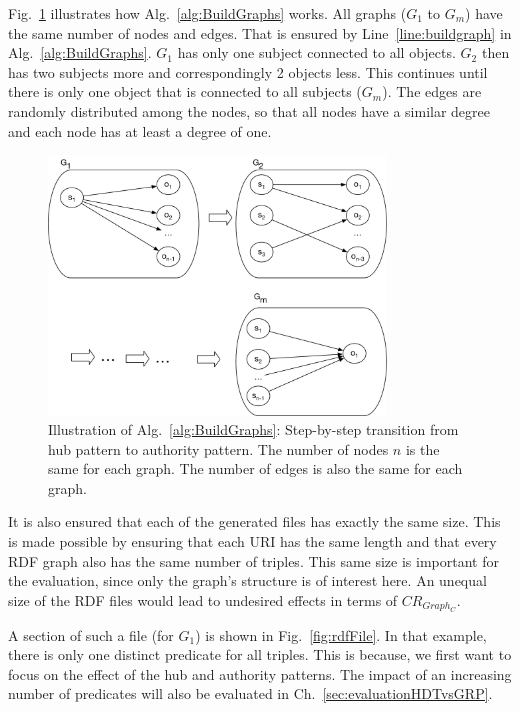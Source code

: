 \clearpage
Fig.~\ref{fig:star_pattern} illustrates how Alg.~\ref{alg:BuildGraphs} works. All graphs ($G_1$ to $G_m$) have the same number of nodes and edges. That is ensured by Line~\ref{line:buildgraph} in Alg.~\ref{alg:BuildGraphs}. $G_1$ has only one subject connected to all objects. $G_2$ then has two subjects more and correspondingly 2 objects less. This continues until there is only one object that is connected to all subjects ($G_m$). The edges are randomly distributed among the nodes, so that all nodes have a similar degree and each node has at least a degree of one.

\begin{figure}[h]
	\centering
	\includegraphics[width=0.8\textwidth]{figures/GRPvsHDT/starpattern.pdf}
	\caption{Illustration of Alg.~\ref{alg:BuildGraphs}: Step-by-step transition from hub pattern to authority pattern. The number of nodes $n$ is the same for each graph. The number of edges is also the same for each graph.}
	\label{fig:star_pattern}
\end{figure}

It is also ensured that each of the generated files has exactly the same size. This is made possible by ensuring that each URI has the same length and that every RDF graph also has the same number of triples. This same size is important for the evaluation, since only the graph's structure is of interest here. An unequal size of the RDF files would lead to undesired effects in terms of $CR_{Graph_C}$.

A section of such a file (for $G_1$) is shown in Fig.~\ref{fig:rdfFile}. In that example, there is only one distinct predicate for all triples. This is because, we first want to focus on the effect of the hub and authority patterns. The impact of an increasing number of predicates will also be evaluated in Ch.~\ref{sec:evaluationHDTvsGRP}.


